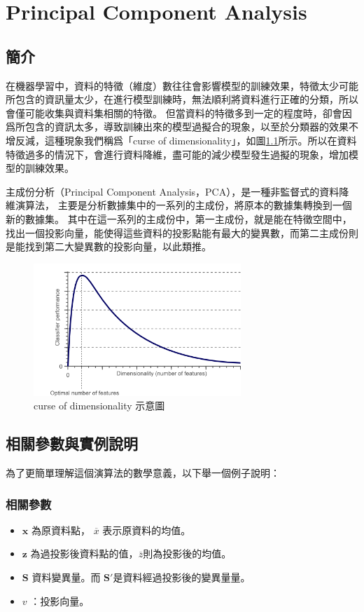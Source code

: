 \chapter{Principal Component Analysis}
\label{chapter:pca}
\section{簡介}
\label{sec:introduction}


在機器學習中，資料的特徵（維度）數往往會影響模型的訓練效果，特徵太少可能所包含的資訊量太少，在進行模型訓練時，無法順利將資料進行正確的分類，所以會僅可能收集與資料集相關的特徵。
但當資料的特徵多到一定的程度時，卻會因爲所包含的資訊太多，導致訓練出來的模型過擬合的現象，以至於分類器的效果不增反減，這種現象我們稱爲「curse of dimensionality」，如圖\ref{fig:CurseOfDimesionality}所示。所以在資料特徵過多的情況下，會進行資料降維，盡可能的減少模型發生過擬的現象，增加模型的訓練效果。

主成份分析（Principal Component Analysis，PCA），是一種非監督式的資料降維演算法，
主要是分析數據集中的一系列的主成份，將原本的數據集轉換到一個新的數據集。
其中在這一系列的主成份中，第一主成份，就是能在特徵空間中，找出一個投影向量，能使得這些資料的投影點能有最大的變異數，而第二主成份則是能找到第二大變異數的投影向量，以此類推。




\begin{figure}[h]
	\centering
	\includegraphics[height=5cm]{./pic/NZgacRXF.png}
	\caption{curse of dimensionality 示意圖}
	\label{fig:CurseOfDimesionality}
\end{figure}

\section{相關參數與實例說明}
為了更簡單理解這個演算法的數學意義，以下舉一個例子說明：

\subsection{相關參數}
\begin{itemize}
	\item
		\(\mathbf{x}\) 為原資料點， \(\overline{x}\) 表示原資料的均值。
	\item
	     \(\mathbf{z}\) 為過投影後資料點的值，\(\overline{z}\)則為投影後的均值。 
	\item
	      \(\mathbf{S}\) 資料變異量。而 \(\mathbf{{S}'}\)是資料經過投影後的變異量量。
	\item
	      \(v\) ：投影向量。
\end{itemize}


